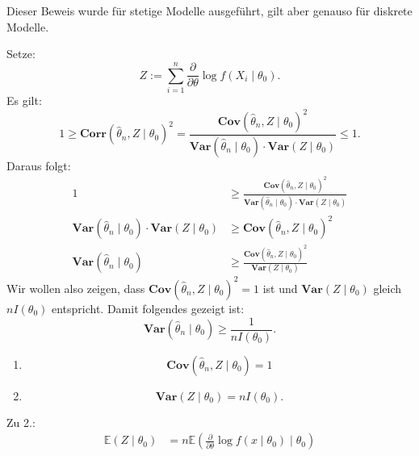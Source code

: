 \documentclass[10pt]{article}
\newcommand{\EW}{\mathbb{E}} %
\newcommand{\ablt}{\frac{\partial}{\partial \theta}}
\newenvironment{BWS}[1][]
{\begin{Beweis}[frametitle=#1]}{\end{Beweis}}
\begin{document}
	\begin{BWS}[Beweis 1.4.1 (Cramér-Rao-Schranke)]
		Dieser Beweis wurde für stetige Modelle ausgeführt, gilt aber genauso für diskrete Modelle.
		
		Setze:
		\begin{equation*}
			Z := \sum_{i=1}^{n} \frac{\partial}{\partial \theta} \log f(X_i \mid \theta_0).
		\end{equation*}
		Es gilt:
		\begin{equation*}
			1 \geq \textbf{Corr}(\hat{\theta}_n, Z \mid \theta_0)^2 = \frac{\textbf{Cov}(\hat{\theta}_n, Z \mid \theta_0)^2}{\textbf{Var}(\hat{\theta}_n \mid \theta_0) \cdot \textbf{Var}(Z \mid \theta_0)} \leq 1.
		\end{equation*}
		Daraus folgt:
		\begin{equation*}
			\begin{split}
				1 &\geq \frac{\textbf{Cov}(\hat{\theta}_n, Z \mid \theta_0)^2}{\textbf{Var}(\hat{\theta}_n \mid \theta_0) \cdot \textbf{Var}(Z \mid \theta_0)}\\
				\textbf{Var}(\hat{\theta}_n \mid \theta_0) \cdot \textbf{Var}(Z \mid \theta_0) &\geq \textbf{Cov}(\hat{\theta}_n, Z \mid \theta_0)^2\\
				\textbf{Var}(\hat{\theta}_n \mid \theta_0) &\geq \frac{\textbf{Cov}(\hat{\theta}_n, Z \mid \theta_0)^2}{\textbf{Var}(Z \mid \theta_0)}
			\end{split}
		\end{equation*}
		Wir wollen also zeigen, dass $\textbf{Cov}(\hat{\theta}_n, Z \mid \theta_0)^2 = 1$ ist und $\textbf{Var}(Z \mid \theta_0)$ gleich $nI(\theta_0)$ entspricht. Damit folgendes gezeigt ist:
		\begin{equation*}
			\textbf{Var}(\hat{\theta}_n \mid \theta_0) \geq \frac{1}{nI(\theta_0)}.
		\end{equation*}
		\begin{enumerate}
			\item 
			\begin{equation*}
				\textbf{Cov}(\hat{\theta}_n, Z \mid \theta_0) = 1
			\end{equation*}
			\item 
			\begin{equation*}
				\textbf{Var}(Z\mid \theta_0) = nI(\theta_0).
			\end{equation*}
		\end{enumerate}
		Zu 2.:
		\begin{equation*}
			\begin{split}
				\EW (Z \mid \theta_0) &=  n\EW\left(\ablt \log f(x \mid \theta_0)\mid \theta_0\right)\\

\end{split}
\end{equation*}
\end{BWS}
\end{document}
